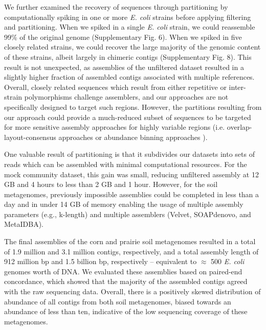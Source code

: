 \documentclass{nature}%
\begin{document}
We further examined the recovery of sequences through partitioning by
computationally spiking in one or more \emph{E. coli} strains before
applying filtering and partitioning.  When we spiked in a single
\emph{E. coli} strain, we could reassemble 99\% of the original genome
(Supplementary Fig. 6).  When we spiked in five closely related strains,
we could recover the large majority of the genomic
content of these strains, albeit largely in chimeric contigs (Supplementary
Fig. 8).  This result is not unexpected, as
assemblies of the unfiltered dataset resulted in a slightly higher
fraction of assembled contigs associated with multiple references.
Overall, closely related sequences which result from either repetitive
or inter-strain polymorphisms challenge assemblers, and our
approaches are not specifically designed to target such regions.
However, the partitions resulting from our approach could provide a 
much-reduced subset of sequences to be
targeted for more sensitive assembly approaches for highly variable regions
(i.e. overlap-layout-consensus approaches or abundance binning
approaches \cite{Sharon:2012kx}).

One valuable result of partitioning is that it subdivides our datasets
into sets of reads which can be assembled with minimal
computational resources.  For the mock community dataset, this gain
was small, reducing unfiltered assembly at 12 GB and 4 hours to less
than 2 GB and 1 hour.  However, for the soil metagenomes, previously
impossible assemblies could be completed in less than a day and in
under 14 GB of memory enabling the usage of multiple assembly
parameters (e.g., k-length) and multiple assemblers (Velvet,
SOAPdenovo, and MetaIDBA).


The final assemblies of the corn and prairie soil metagenomes resulted
in a total of 1.9 million and 3.1 million contigs, respectively, and a
total assembly length of 912 million bp and 1.5 billion bp,
respectively -- equivalent to $\approx$ 500 \emph{E. coli} genomes worth of DNA.  We evaluated these assemblies based on paired-end concordance, which showed that the majority of the assembled contigs agreed with the raw sequencing data.  Overall,
there is a positively skewed distribution of abundance of all contigs
from both soil metagenomes, biased towards an abundance of less than
ten, indicative of the low sequencing coverage of these
metagenomes.
\end{document}
